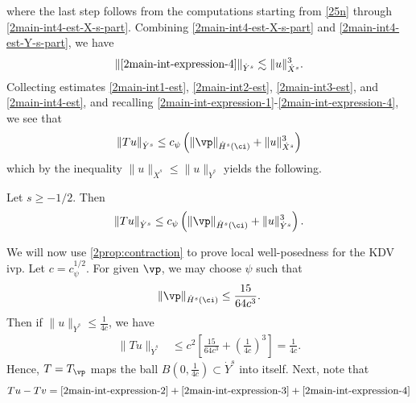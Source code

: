 %
%
where the last step follows from the computations starting from \eqref{25n}
through \eqref{2main-int4-est-X-s-part}.
Combining \eqref{2main-int4-est-X-s-part} and \eqref{2main-int4-est-Y-s-part}, we
have
%
%
\begin{equation}
\label{2main-int4-est}
	\begin{split}
		\|\eqref{2main-int-expression-4}\|_{\dot{Y}^s} \lesssim \|u\|_{\dot{X}^s}^{3}.
	\end{split}
\end{equation}
%
%
Collecting estimates \eqref{2main-int1-est}, \eqref{2main-int2-est}, 
\eqref{2main-int3-est}, and \eqref{2main-int4-est}, and recalling 
\eqref{2main-int-expression-1}-\eqref{2main-int-expression-4}, we see that
$$\|Tu\|_{\dot{Y}^s} \le c_\psi \left( \|\vp \|_{\dot{H}^s(\ci)} + \|u\|_{\dot{X}^s}^3 \right )$$ 
which by the inequality $\|u\|_{\dot{X}^s} \le \|u\|_{\dot{Y}^s}$ yields the following.
%
%				 
%
\begin{proposition}
\label{2prop:contraction}
Let $s \ge -1/2$. Then
%
\begin{equation*}
	\begin{split}
		\|Tu\|_{\dot{Y}^s} \le c_\psi \left( \|\vp \|_{\dot{H}^s(\ci)} + \|u\|_{\dot{Y}^s}^3 
		\right).
	\end{split}
\end{equation*}
%
\end{proposition}
We will now use \cref{2prop:contraction} to prove local well-posedness for the 
KDV ivp. Let $c = c_{\psi}^{1/2}$. For given $\vp$, we may choose $\psi$ such
that 
%
\begin{equation*}
	\begin{split}
		\|\vp\|_{\dot{H}^s(\ci)} \le \frac{15}{64c^3}.
	\end{split}
\end{equation*}
%
Then if $\|u\|_{\dot{Y}^s} \le \frac{1}{4c}$, we have
%
\begin{equation*}
	\begin{split}
		\|T u \|_{\dot{Y}^s} 
		& \le c^2 \left[ \frac{15}{64c^3} + \left( 
		\frac{1}{4c} \right)^3 \right]
		=  \frac{1}{4c}.
	\end{split}
\end{equation*}
%
Hence, $T=T_{\vp}$ maps the ball $B\left( 0, \frac{1}{4c} \right) \subset \dot{Y}^s$ into 
itself. Next, note that
%
\begin{equation*}
	\begin{split}
		Tu - Tv = \eqref{2main-int-expression-2} + \eqref{2main-int-expression-3} 
		+ \eqref{2main-int-expression-4}
	\end{split}
\end{equation*}
